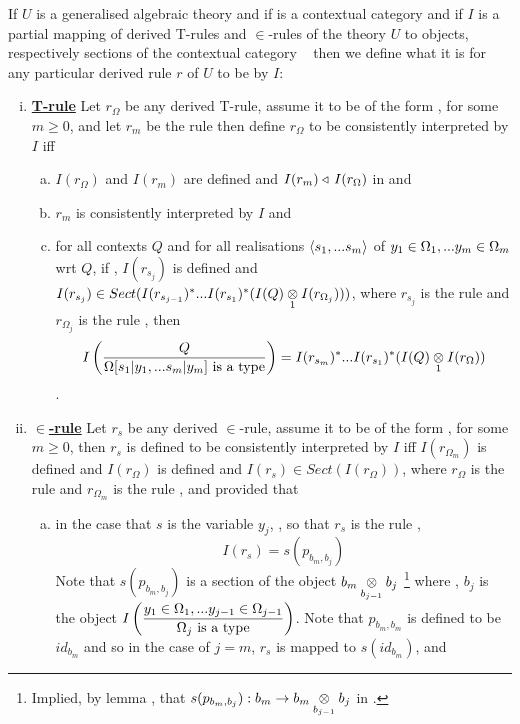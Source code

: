 \newcommand{\IfIpartialmappingUtoC}{If $U$ is a generalised algebraic theory and if \catcw is a contextual category 
and if $I$ is a partial mapping of derived T-rules and $\in$-rules of the theory $U$ to objects, respectively sections of the contextual category \catc}
\newcommand{\IfIpartialmappingUtoCw}{\IfIpartialmappingUtoC\ }
\begin{definition}
\IfIpartialmappingUtoCw
then we define what it is for any particular derived rule $r$ of $U$ to be  by $I$: \\
\begin{enumerate}[(i)]
\item \underline{\textbf{T-rule}} 
Let $r_\Omega$ be any  derived T-rule, assume it to be of the form \ZOmega, for some $m \geq 0$, and let $r_m$ be the rule 
then define $r_\Omega$ to be consistently interpreted by $I$ iff
\begin{enumerate}[(a)] 
\item $I(r_\Omega)$ and $I(r_m)$ are defined and $I(r_m) \base\, I(r_\Omega)$ in \catcw and 
\item $r_m$ is consistently interpreted by $I$  and
\item
for all contexts $Q$ and for all realisations $\tuple{\sm}$ of $\yOmega{m}$ wrt $Q$, 
if \foreachj, $I(r_{s_j})$ is defined 
and $I(r_{s_j}) \in Sect(I(r_{s_{j-1}})^*...I(r_{s_1})^*(\crossx{I(Q)}{I(r_{\Omega_j})}{1}))$,
where $r_{s_j}$ is the rule  
and $r_{\Omega_j}$ is the rule ,
then
$$ \Imappedrule{Q}{\isT{\Omega[\SUBsFORy{m}]}} 
= I(r_{s_m})^*...I(r_{s_1})^*(\crossx{I(Q)}{I(r_\Omega)}{1})$$
. 
\end {enumerate}
\item \underline{\textbf{$\in$-rule}} 
Let $r_s$ be any derived $\in$-rule, assume it to be of the form \ZsOmega, for some $m \geq 0$, then
$r_s$ is defined to be consistently interpreted by $I$ 
iff $I(r_{\Omega_m})$ is defined and $I(r_\Omega)$ is defined and $\displaystyle I(r_s) \in Sect(I(r_\Omega))$, where
$r_\Omega$ is the rule \ZOmega and $r_{\Omega_m}$ is the rule , and provided that
\begin{enumerate}[(a)]
\item in the case that $s$ is the variable $y_j$, \forsomej, so that $r_s$ is the rule ,
$$I(r_s) = s(p_{b_m,b_j})$$
Note that $s(p_{b_m,b_j})$ is a section of the object $\crossx{b_m}{b_j}{b_{j-1}}$
\footnote{
Implied, by lemma , that $s(p_{b_m,b_j}): b_m \morph \crossx{b_m}{b_j}{b_{j-1}}$ in \catc.
} %
where \foreachj, $b_j$ is the object
$\displaystyle\Imappedrule{\yOmega{j-1}}{\isT{\Omega_j}}$.  
Note that $p_{b_m,b_m}$ is defined to be $id_{b_m}$ and so in the case of $j=m$, $r_s$
is mapped to   $s(id_{b_m})$, and


\end{enumerate}
\end{enumerate}
\end{definition}
